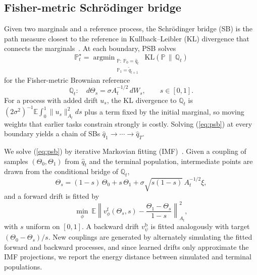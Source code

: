 \subsection{Fisher-metric Schr\"odinger bridge}
\label{sec:bridge}

Given two marginals and a reference process, the Schr\"odinger bridge (SB) is
the path measure closest to the reference in Kullback--Leibler (KL) divergence
that connects the marginals~\cite{leonard2014survey}. At each boundary, PSB
solves
\begin{equation}
    \mathbb{P}^\star_t=\mathop{\arg\min}_{\substack{\mathbb{P}:\ \mathbb{P}_0=\hat q_t\\
    \mathbb{P}_1=\tilde q_{t+1}}}\ \mathrm{KL}(\mathbb{P}\,\|\,\mathbb{Q}_t)
    \label{eq:psb}
\end{equation}
for the Fisher-metric Brownian reference
\begin{equation}
    \mathbb{Q}_t:\quad d\Theta_s=\sigma A_t^{-1/2}\,dW_s,\qquad s\in[0,1].
    \label{eq:fisherreference}
\end{equation}
For a process with added drift $u_s$, the KL divergence to $\mathbb{Q}_t$ is
$(2\sigma^2)^{-1}\mathbb{E}\!\int_0^1\|u_s\|_{A_t}^2ds$ plus a term fixed by the
initial marginal, so moving weights that earlier tasks constrain strongly is
costly. Solving (\ref{eq:psb}) at every boundary yields a chain of SBs
$\hat q_1\to\cdots\to\hat q_T$.

We solve (\ref{eq:psb}) by iterative Markovian fitting (IMF)~\cite{shi2023dsbm}.
Given a coupling of samples $(\Theta_0,\Theta_1)$ from $\hat q_t$ and the
terminal population, intermediate points are drawn from the conditional bridge
of $\mathbb{Q}_t$,
\begin{equation}
    \Theta_s=(1-s)\,\Theta_0+s\,\Theta_1+\sigma\sqrt{s(1-s)}\,A_t^{-1/2}\xi,
    \label{eq:conditionalbridge}
\end{equation}
and a forward drift is fitted by
\begin{equation}
    \min_\phi\ \mathbb{E}\left\|v^{\mathrm{f}}_\phi(\Theta_s,s)
    -\frac{\Theta_1-\Theta_s}{1-s}\right\|_{A_t}^{2},
    \label{eq:lossf}
\end{equation}
with $s$ uniform on $[0,1]$. A backward drift $v^{\mathrm{b}}_\psi$ is fitted
analogously with target $(\Theta_0-\Theta_s)/s$. New couplings are generated by alternately
simulating the fitted forward and backward processes, and since learned drifts
only approximate the IMF projections, we report the energy distance between
simulated and terminal populations.

